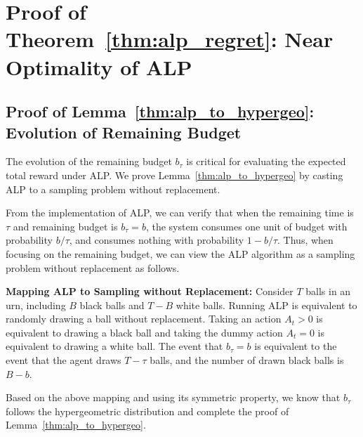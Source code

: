 \section{Proof of Theorem~\ref{thm:alp_regret}: Near Optimality of ALP}\label{app:proof_alp_regret}

\subsection{Proof of Lemma~\ref{thm:alp_to_hypergeo}: Evolution of Remaining Budget}

The evolution of the remaining budget $b_\tau$ is critical  for evaluating the expected total reward under ALP. We prove Lemma~\ref{thm:alp_to_hypergeo} by casting ALP to a sampling problem without replacement.

From the implementation of ALP, we can verify that when the remaining time is $\tau$ and remaining budget is $b_{\tau} = b$,
the system consumes one unit of budget with probability $b/\tau$, and consumes nothing with probability $1-b/\tau$.
Thus, when focusing on the remaining budget,
we can view the ALP algorithm as a sampling problem without replacement as follows.

\textbf{Mapping ALP to Sampling without Replacement:} Consider $T$ balls in an urn,
including $B$ black balls and $T-B$ white balls. Running ALP is equivalent to randomly drawing a ball without replacement.
Taking an action $A_t > 0$ is equivalent to drawing  a black ball and taking the dummy action $A_t = 0$ is equivalent to drawing a white ball.
The event that $b_{\tau} = b$ is equivalent to the event that the agent draws $T- \tau$ balls, and the number of drawn black balls is $B-b$.

Based on the above mapping and using its symmetric property, we know that $b_\tau$ follows the hypergeometric distribution \cite{Dubhashi2009Concentration} and complete the proof of Lemma~\ref{thm:alp_to_hypergeo}.

